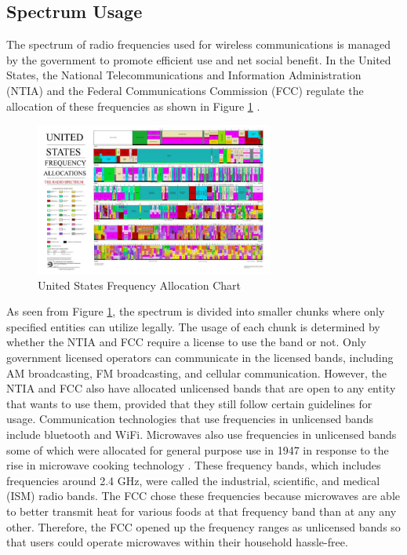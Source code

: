 \subsection{Spectrum Usage}
The spectrum of radio frequencies used for wireless communications is managed by the government to promote efficient use and net social benefit. In the United States, the National Telecommunications and Information Administration (NTIA) and the Federal Communications Commission (FCC) regulate the allocation of these frequencies as shown in Figure \ref{fig:freq_chart} \cite{FCC_Info}. 
\begin{figure}[h!]
\centering
\includegraphics[width=0.70\textwidth]{img/the_radio_spectrum.jpg}
\caption{United States Frequency Allocation Chart \cite{FCC_Info}}
\label{fig:freq_chart}
\end{figure}
As seen from Figure \ref{fig:freq_chart}, the spectrum is divided into smaller chunks where only specified entities can utilize legally. The usage of each chunk is determined by whether the NTIA and FCC require a license to use the band or not. Only government licensed operators can communicate in the licensed bands, including AM broadcasting, FM broadcasting, and cellular communication. However, the NTIA and FCC also have allocated unlicensed bands that are open to any entity that wants to use them, provided that they still follow certain guidelines for usage. Communication technologies that use frequencies in unlicensed bands include bluetooth and WiFi. Microwaves also use frequencies in unlicensed bands some of which were allocated for general purpose use in 1947 in response to the rise in microwave cooking technology \cite{FCC1947}. These frequency bands, which includes frequencies around 2.4 GHz, were called the industrial, scientific, and medical (ISM) radio bands. The FCC chose these frequencies because microwaves are able to better transmit heat for various foods at that frequency band than at any any other.  Therefore, the FCC opened up the frequency ranges as unlicensed bands so that users could operate microwaves within their household hassle-free. 

